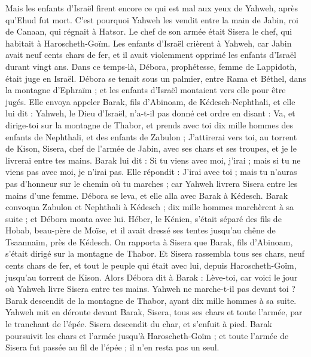 \begin{multicols}{2}
\VerseOne{}Mais les enfants d'Israël firent encore ce qui est mal aux yeux de Yahweh, après qu'Ehud fut mort.
C'est pourquoi Yahweh les vendit entre la main de Jabin, roi de Canaan, qui régnait à Hatsor. Le chef de son armée était Sisera le chef, qui habitait à Haroscheth-Goïm.
Les enfants d'Israël crièrent à Yahweh, car Jabin avait neuf cents chars de fer, et il avait violemment opprimé les enfants d'Israël durant vingt ans.
Dans ce temps-là, Débora, prophétesse, femme de Lappidoth, était juge en Israël.
Débora se tenait sous un palmier, entre Rama et Béthel, dans la montagne d'Ephraïm ; et les enfants d'Israël montaient vers elle pour être jugés.
Elle envoya appeler Barak, fils d'Abinoam, de Kédesch-Nephthali, et elle lui dit : Yahweh, le Dieu d'Israël, n'a-t-il pas donné cet ordre en disant : Va, et dirige-toi sur la montagne de Thabor, et prends avec toi dix mille hommes des enfants de Nephthali, et des enfants de Zabulon ;
J’attirerai vers toi, au torrent de Kison, Sisera, chef de l'armée de Jabin, avec ses chars et ses troupes, et je le livrerai entre tes mains.
Barak lui dit : Si tu viens avec moi, j'irai ; mais si tu ne viens pas avec moi, je n’irai pas.
Elle répondit : J’irai avec toi ; mais tu n'auras pas d'honneur sur le chemin où tu marches ; car Yahweh livrera Sisera entre les mains d'une femme. Débora se leva, et elle alla avec Barak à Kédesch.
Barak convoqua Zabulon et Nephthali à Kédesch ; dix mille hommes marchèrent à sa suite ; et Débora monta avec lui.
Héber, le Kénien, s’était séparé des fils de Hobab, beau-père de Moïse, et il avait dressé ses tentes jusqu'au chêne de Tsaannaïm, près de Kédesch.
On rapporta à Sisera que Barak, fils d'Abinoam, s’était dirigé sur la montagne de Thabor.
Et Sisera rassembla tous ses chars, neuf cents chars de fer, et tout le peuple qui était avec lui, depuis Haroscheth-Goïm, jusqu'au torrent de Kison.
Alors Débora dit à Barak : Lève-toi, car voici le jour où Yahweh livre Sisera entre tes mains. Yahweh ne marche-t-il pas devant toi ? Barak descendit de la montagne de Thabor, ayant dix mille hommes à sa suite.
Yahweh mit en déroute devant Barak,  Sisera, tous ses chars et toute l'armée, par le tranchant de l'épée. Sisera descendit du char, et s'enfuit à pied.
Barak poursuivit les chars et l'armée jusqu'à Haroscheth-Goïm ; et toute l'armée de Sisera fut passée au fil de l'épée ; il n'en resta pas un seul.

\end{multicols}
